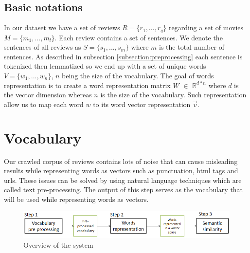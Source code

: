 \documentclass{article}
\begin{document}
\subsection{Basic notations}
In our dataset we have a set of reviews $R = \{r_{1},..., r_{q} \}$ regarding a set of movies $M = \{m_{1},...,m_{l}\}$. Each review contains a set of sentences. We denote the sentences of all reviews as  $S = \{s_1, ..., s_m\}$ where $m$ is the total number of sentences. As described in subsection \ref{subsection:preprocessing} each sentence is tokenized then lemmatized so we end up with a set of unique words $V= \{w_{1},..., w_{n} \}$, $n$ being the size of the vocabulary. The goal of words representation is to create a word representation matrix 
$W$ $\in$  $\mathbb{R}^{d*n} $
where $d$ is the vector dimension whereas $n$ is the size of the vocabulary.
Such representation allow us to map each word $w$ to its word vector representation $\vec{v}$.
\section{Vocabulary}
\label{vocab}
Our crawled corpus of reviews contains lots of noise that can cause misleading results while representing words as vectors such as punctuation, html tags and urls. These issues can be solved by using natural language techniques which are called text pre-processing. The output of this step serves as the vocabulary that will be used while representing words as vectors.
\begin{figure}
 \begin{center}
 \includegraphics[scale=0.6]{introChapter1} 
 \caption{ Overview of the system} 
  \label{introChapter1}
  \end{center}
 \end{figure}
 
\end{document}
